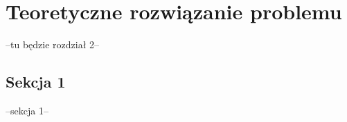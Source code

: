 \chapter{Teoretyczne rozwiązanie problemu}
\thispagestyle{chapterBeginStyle}

--tu będzie rozdział 2--

\section{Sekcja 1}
--sekcja 1--
